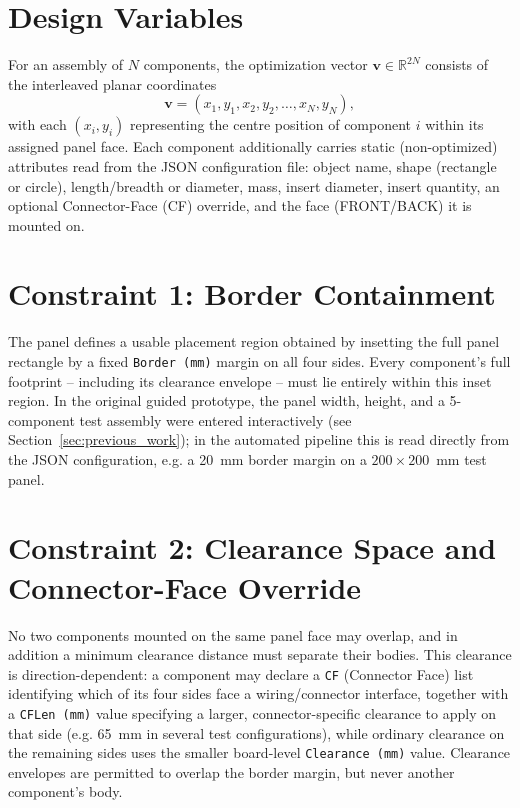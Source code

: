 \documentclass[11pt,a4paper,oneside]{report}
\begin{document}
\section{Design Variables}
For an assembly of $N$ components, the optimization vector $\mathbf{v} \in \mathbb{R}^{2N}$ consists of the interleaved planar coordinates
\begin{equation}
\mathbf{v} = (x_1, y_1, x_2, y_2, \dots, x_N, y_N),
\end{equation}
with each $(x_i, y_i)$ representing the centre position of component $i$ within its assigned panel face. Each component additionally carries static (non-optimized) attributes read from the JSON configuration file: object name, shape (rectangle or circle), length/breadth or diameter, mass, insert diameter, insert quantity, an optional Connector-Face (CF) override, and the face (FRONT/BACK) it is mounted on.

\section{Constraint 1: Border Containment}
The panel defines a usable placement region obtained by insetting the full panel rectangle by a fixed \texttt{Border (mm)} margin on all four sides. Every component's full footprint -- including its clearance envelope -- must lie entirely within this inset region. In the original guided prototype, the panel width, height, and a 5-component test assembly were entered interactively (see Section~\ref{sec:previous_work}); in the automated pipeline this is read directly from the JSON configuration, e.g. a 20~mm border margin on a $200 \times 200$~mm test panel.

\section{Constraint 2: Clearance Space and Connector-Face Override}
\label{sec:clearance}
No two components mounted on the same panel face may overlap, and in addition a minimum clearance distance must separate their bodies. This clearance is direction-dependent: a component may declare a \texttt{CF} (Connector Face) list identifying which of its four sides face a wiring/connector interface, together with a \texttt{CFLen (mm)} value specifying a larger, connector-specific clearance to apply on that side (e.g. 65~mm in several test configurations), while ordinary clearance on the remaining sides uses the smaller board-level \texttt{Clearance (mm)} value. Clearance envelopes are permitted to overlap the border margin, but never another component's body.
\end{document}
